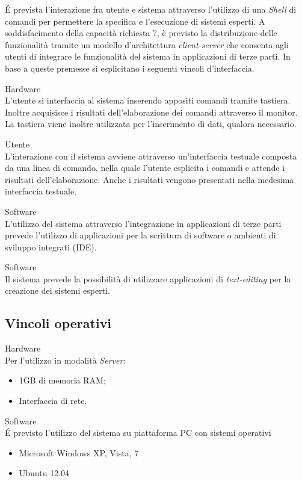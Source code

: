 \'E prevista l'interazione fra utente e sistema attraverso l'utilizzo di una \emph{Shell} di comandi per permettere la specifica e l'esecuzione di sistemi esperti.  A soddisfacimento della capacità richiesta 7, è previsto la distribuzione delle funzionalità tramite un modello d'architettura \emph{client-server} che consenta agli utenti di integrare le funzionalità del sistema in applicazioni di terze parti. In base a queste premesse si esplicitano i seguenti vincoli d'interfaccia.
\vincolistart
	\item Hardware\\	
	L'utente si interfaccia al sistema inserendo appositi comandi tramite tastiera. Inoltre acquisisce i risultati dell'elaborazione dei comandi attraverso il monitor. La tastiera viene inoltre utilizzata per l'inserimento di dati, qualora necessario.
	
	\item Utente\\
	L'interazione con il sistema avviene attraverso un'interfaccia testuale composta da una linea di comando, nella quale l'utente esplicita i comandi e attende i risultati dell'elaborazione. Anche i risultati vengono presentati nella medesima interfaccia testuale.
	
	\item Software\\
	L'utilizzo del sistema attraverso l'integrazione in applicazioni di terze parti prevede l'utilizzo di applicazioni per la scrittura di software o ambienti di sviluppo integrati (IDE).
	
	\item Software\\
	Il sistema prevede la possibilità di utilizzare applicazioni di \emph{text-editing} per la creazione dei sistemi esperti.
	
\vincoliend

\subsection{Vincoli operativi}

\vincolistart
	\item Hardware\\
	Per l'utilizzo in modalità \emph{Server}:
	\begin{itemize}
		\item 1GB di memoria RAM;
		\item Interfaccia di rete.
	\end{itemize}
	\item Software\\
	\'E previsto l'utilizzo del sistema su piattaforma PC con sistemi operativi
	\begin{itemize}
		\item Microsoft Windows XP, Vista, 7
		\item Ubuntu 12.04
	\end{itemize}
\vincoliend

